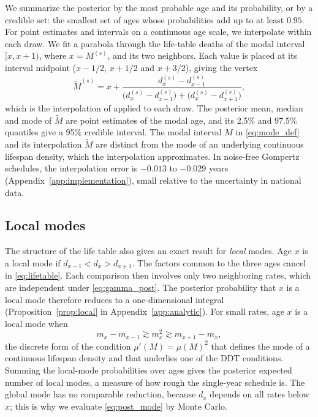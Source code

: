 \documentclass[12pt, letterpaper]{article}
\begin{document}
We summarize the posterior by the most probable age and its probability, or by a credible set: the smallest set of ages whose probabilities add up to at least $0.95$. For point estimates and intervals on a continuous age scale, we interpolate within each draw. We fit a parabola through the life-table deaths of the modal interval $[x, x+1)$, where $x = M^{(s)}$, and its two neighbors. Each value is placed at its interval midpoint ($x - 1/2$, $x + 1/2$ and $x + 3/2$), giving the vertex
\begin{equation}
\tilde{M}^{(s)} = x + \frac{d_x^{(s)} - d_{x-1}^{(s)}}{\big(d_x^{(s)} - d_{x-1}^{(s)}\big) + \big(d_x^{(s)} - d_{x+1}^{(s)}\big)},
\label{eq:interp}
\end{equation}
which is the interpolation of \citet{kannisto2001mode} applied to each draw. The posterior mean, median and mode of $\tilde{M}$ are point estimates of the modal age, and its 2.5\% and 97.5\% quantiles give a 95\% credible interval. The modal interval $M$ in \eqref{eq:mode_def} and its interpolation $\tilde{M}$ are distinct from the mode of an underlying continuous lifespan density, which the interpolation approximates. In noise-free Gompertz schedules, the interpolation error is $-0.013$ to $-0.029$ years (Appendix~\ref{app:implementation}), small relative to the uncertainty in national data.

\subsection{Local modes}
\label{sec:analytic}

The structure of the life table also gives an exact result for \emph{local} modes. Age $x$ is a local mode if $d_{x-1} < d_x > d_{x+1}$. The factors common to the three ages cancel in \eqref{eq:lifetable}. Each comparison then involves only two neighboring rates, which are independent under \eqref{eq:gamma_post}. The posterior probability that $x$ is a local mode therefore reduces to a one-dimensional integral (Proposition~\ref{prop:local} in Appendix~\ref{app:analytic}). For small rates, age $x$ is a local mode when
\begin{equation*}
m_x - m_{x-1} \gtrsim m_x^2 \gtrsim m_{x+1} - m_x ,
\end{equation*}
the discrete form of the condition $\mu'(M) = \mu(M)^2$ that defines the mode of a continuous lifespan density \citep{canudas2008modal} and that underlies one of the DDT conditions. Summing the local-mode probabilities over ages gives the posterior expected number of local modes, a measure of how rough the single-year schedule is. The global mode has no comparable reduction, because $d_x$ depends on all rates below $x$; this is why we evaluate \eqref{eq:post_mode} by Monte Carlo.
\end{document}

